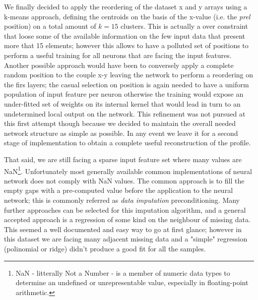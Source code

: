 We finally decided to apply the reordering of the dataset x and y arrays using a k-means approach, defining the centroids on the basis of the x-value (i.e. the \textit{prel} position) on a total amount of $k=15$ clusters. This is actually a over constraint that loose some of the available information on the few input data that present more that 15 elements; however this allows to have a polluted set of positions to perform a useful training for all neurons that are facing the input features.
Another possible approach would have been to conversely apply a complete random position to the couple x-y leaving the network to perform a reordering on the firs layers; the casual selection on position is again needed to have a uniform population of input feature per neuron otherwise the training would expose an under-fitted set of weights on its internal kernel that would lead in turn to an undetermined local output on the network.
This refinement was not pursued at this first attempt though because we decided to maintain the overall needed network structure as simple as possible. In any event we leave it for a second stage of implementation to obtain a complete useful reconstruction of the profile.

That said, we are still facing a sparse input feature set where many values are NaN\footnote{NaN - litterally Not a Number - is a member of numeric data types to determine an undefined or unrepresentable value, especially in floating-point arithmetic. }. Unfortunately most generally available common implementations of neural network does not comply with NaN values. The common approach is to fill the empty gaps with a pre-computed value before the application to the neural network; this is commonly referred as \textit{data imputation} preconditioning. Many further approaches can be selected for this imputation algorithm, and a general accepted approach is a regression of some kind on the neighbour of missing data. This seemed a well documented and easy way to go at first glance; however in this dataset we are facing many adjacent missing data and a "simple" regression (polinomial or ridge) didn't produce a good fit for all the samples. 


